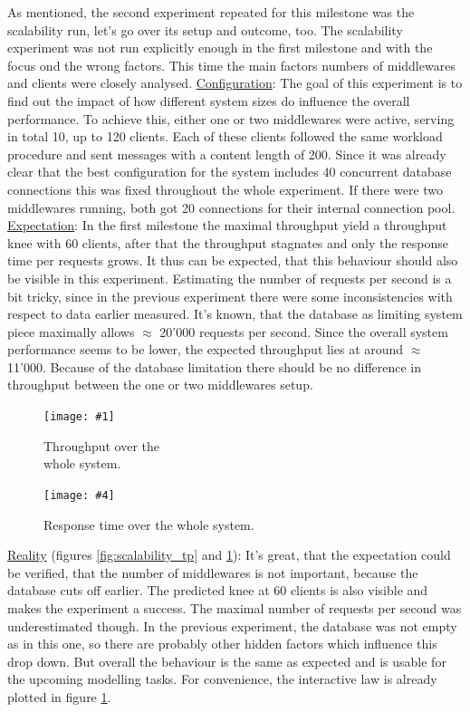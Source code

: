 \documentclass[11pt]{article}
\newcommand\TwoFig[6]{%
	\sbox\IBoxA{\texttt{[image: \#1]}}
	\sbox\IBoxB{\texttt{[image: \#4]}}%
	\ifdim\ht\IBoxA>\ht\IBoxB
	\setlength\IHeight{\ht\IBoxB}\else\setlength\IHeight{\ht\IBoxA}\fi%
	\begin{figure}[!htb]
		\minipage[t]{0.5\textwidth}\centering
		\texttt{[image: \#1]}
		\caption{#2}\label{#3}
		\endminipage \hfill
		\minipage[t]{0.5\textwidth}\centering
		\texttt{[image: \#4]}
		\caption{#5}\label{#6}
		\endminipage
	\end{figure}%
}
\begin{document}
As mentioned, the second experiment repeated for this milestone was the scalability run, let's go over its setup and outcome, too. The scalability experiment was not run explicitly enough in the first milestone and with the focus ond the wrong factors. This time the main factors numbers of middlewares and clients were closely analysed.
\newline\underline{Configuration}: The goal of this experiment is to find out the impact of how different system sizes do influence the overall performance. To achieve this, either one or two middlewares were active, serving in total 10, up to 120 clients. Each of these clients followed the same workload procedure and sent messages with a content length of 200. Since it was already clear that the best configuration for the system includes 40 concurrent database connections this was fixed throughout the whole experiment. If there were two middlewares running, both got 20 connections for their internal connection pool. 
\newline\underline{Expectation}: In the first milestone the maximal throughput yield a throughput knee with 60 clients, after that the throughput stagnates and only the response time per requests grows. It thus can be expected, that this behaviour should also be visible in this experiment. Estimating the number of requests per second is a bit tricky, since in the previous experiment there were some inconsistencies with respect to data earlier measured. It's known, that the database as limiting system piece maximally allows $\approx$ 20'000 requests per second. Since the overall system performance seems to be lower, the expected throughput lies at around $\approx$ 11'000. Because of the database limitation there should be no difference in throughput between the one or two middlewares setup.
\TwoFig {figures/scalability/tp} {Throughput over the\\ whole system.} {fig:scalability_tp}
		{figures/scalability/rt} {Response time over the whole system.} {fig:scalability_rt}	
\newline\underline{Reality} (figures \ref{fig:scalability_tp} and \ref{fig:scalability_rt}): It's great, that the expectation could be verified, that the number of middlewares is not important, because the database cuts off earlier. The predicted knee at 60 clients is also visible and makes the experiment a success. The maximal number of requests per second was underestimated though. In the previous experiment, the database was not empty as in this one, so there are probably other hidden factors which influence this drop down. But overall the behaviour is the same as expected and is usable for the upcoming modelling tasks. For convenience, the interactive law is already plotted in figure \ref{fig:scalability_rt}.
\end{document}
